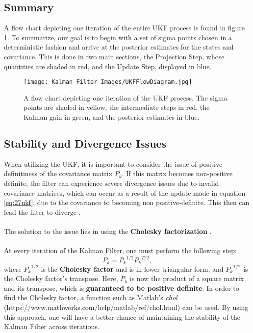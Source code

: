 \documentclass{article}
\begin{document}
    \subsection{Summary}
    A flow chart depicting one iteration of the entire UKF process is found in figure \ref{fig:UKF_Theory_FlowChart}. To summarize, our goal is to begin with a set of sigma points chosen in a deterministic fashion and arrive at the posterior estimates for the states and covariance. This is done in two main sections, the Projection Step, whose quantities are shaded in red, and the Update Step, displayed in blue.
    
    \begin{figure} [H]
    \centering
    \texttt{[image: Kalman Filter Images/UKFFlowDiagram.jpg]}
    \caption{A flow chart depicting one iteration of the UKF process. The sigma points are shaded in yellow, the intermediate steps in red, the Kalman gain in green, and the posterior estimates in blue.}
    \label{fig:UKF_Theory_FlowChart}
    \end{figure}
    
    \subsection{Stability and Divergence Issues}
    When utilizing the UKF, it is important to consider the issue of positive definitiness of the covariance matrix $P_k$. If this matrix becomes non-positive definite, the filter can experience severe divergence issues due to invalid covariance matrices, which can occur as a result of the update made in equation \ref{eq:27ukf}, due to the covariance to becoming non positive-definite. This then can lead the filter to diverge \cite{SimonHaykinText}. \\
    \\
    The solution to the issue lies in using the \textbf{Cholesky factorization} \cite{SimonHaykinText}.
    \\
    \\
    At every iteration of the Kalman Filter, one must perform the following step:
    \begin{equation}
    P_k = {P_k}^{1/2} {P_k}^{T/2},
    \end{equation}
    where ${P_k}^{1/2}$ is the \textbf{Cholesky factor} and is in lower-triangular form, and ${P_k}^{T/2}$ is the Cholesky factor's transpose. Here, $P_k$ is now the product of a square matrix and its transpose, which is \textbf{guaranteed to be positive definite}. In order to find the Cholesky factor, a function such as Matlab's \emph{chol} (https://www.mathworks.com/help/matlab/ref/chol.html) can be used. By using this approach, one will have a better chance of maintaining the stability of the Kalman Filter across iterations.\\
    \\
    
\end{document}
